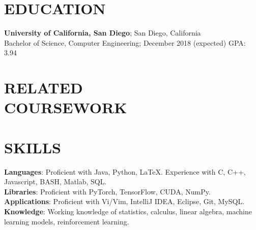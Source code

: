 \documentclass[margin]{res}
\begin{document}
\begin{resume}

\section{EDUCATION}
\textbf{University of California, San Diego}; San Diego, California\\
Bachelor of Science, Computer Engineering; December 2018 (expected)\hfill 
GPA: 3.94

\section{RELATED\\COURSEWORK}
%



\section{SKILLS}

\textbf{Languages}: 
Proficient with Java, Python, \LaTeX.
Experience with C, C++, Javascript, BASH, Matlab, SQL.
\\
\textbf{Libraries}: 
Proficient with PyTorch, TensorFlow, CUDA, NumPy.
\\
\textbf{Applications}: Proficient with Vi/Vim, IntelliJ IDEA, Eclipse, Git,
MySQL.  
\\
\textbf{Knowledge}: Working knowledge of statistics, calculus, linear algebra,
machine learning models, reinforcement learning.


\end{resume}
\end{document}
